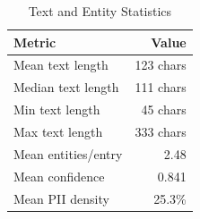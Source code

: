 \begin{table}[h]
\centering
\caption{Text and Entity Statistics}
\label{tab:text-stats}
\begin{tabular}{lr}
\toprule
\textbf{Metric} & \textbf{Value} \\
\midrule
Mean text length & 123 chars \\
Median text length & 111 chars \\
Min text length & 45 chars \\
Max text length & 333 chars \\
\midrule
Mean entities/entry & 2.48 \\
Mean confidence & 0.841 \\
Mean PII density & 25.3\% \\
\bottomrule
\end{tabular}
\end{table}